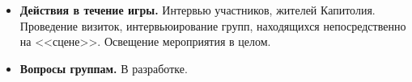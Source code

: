 
\begin{itemize}
\item \textbf{Действия в течение игры.} Интервью участников, жителей Капитолия. Проведение визиток, интервьюирование  групп, находящихся непосредственно на <<сцене>>. Освещение мероприятия в целом.

\item \textbf{Вопросы группам.} В разработке.
\end{itemize}